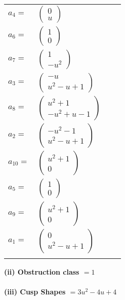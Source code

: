 \documentclass[1p]{elsarticle_modified}
\theoremstyle{definition}
\begin{document}
\begin{tabular}{m{7pt} m{180pt} m{7pt} m{180pt} }
\flushright $a_{4}=$&$\begin{pmatrix}0\\u\end{pmatrix}$ \\
\flushright $a_{6}=$&$\begin{pmatrix}1\\0\end{pmatrix}$ \\
\flushright $a_{7}=$&$\begin{pmatrix}1\\- u^2\end{pmatrix}$ \\
\flushright $a_{3}=$&$\begin{pmatrix}- u\\u^2- u+1\end{pmatrix}$ \\
\flushright $a_{8}=$&$\begin{pmatrix}u^2+1\\- u^2+u-1\end{pmatrix}$ \\
\flushright $a_{2}=$&$\begin{pmatrix}- u^2-1\\u^2- u+1\end{pmatrix}$ \\
\flushright $a_{10}=$&$\begin{pmatrix}u^2+1\\0\end{pmatrix}$ \\
\flushright $a_{5}=$&$\begin{pmatrix}1\\0\end{pmatrix}$ \\
\flushright $a_{9}=$&$\begin{pmatrix}u^2+1\\0\end{pmatrix}$ \\
\flushright $a_{1}=$&$\begin{pmatrix}0\\u^2- u+1\end{pmatrix}$\\&\end{tabular}
\flushleft \textbf{(ii) Obstruction class $= 1$}\\~\\
\flushleft \textbf{(iii) Cusp Shapes $= 3 u^2-4 u+4$}\\~\\
\end{document}
